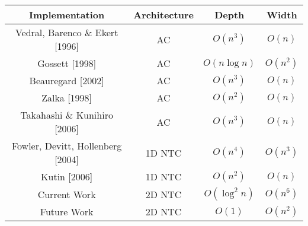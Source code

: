 \documentclass[twoside]{article}
\begin{document}
\begin{tabular}{|c|c|c|c|}
\hline
Implementation             & Architecture      & Depth             & Width     \\
\hline
Vedral, Barenco \& Ekert [1996]   & \textsc{AC}       & $O(n^3)$      & $O(n)$ \\
Gossett [1998]                   & \textsc{AC}       & $O(n \log n)$ & $O(n^2)$  \\
Beauregard [2002]                & \textsc{AC}       & $O(n^3)$      & $O(n)$ \\
Zalka [1998]                     & \textsc{AC}       & $O(n^2)$      & $O(n)$     \\
Takahashi \& Kunihiro [2006]     & \textsc{AC}       & $O(n^3)$      & $O(n)$ \\
Fowler, Devitt, Hollenberg [2004] & \textsc{1D NTC}   & $O(n^4)$ & $O(n^3)$\\
Kutin [2006]                     & \textsc{1D NTC}   & $O(n^2)$ & $O(n)$\\
Current Work               & \textsc{2D NTC}   & $O(\log^2{n})$ & $O(n^6)$   \\
Future Work               & \textsc{2D NTC}   & $O(1)$ & $O(n^2)$   \\
\hline
\end{tabular}

\end{document}
